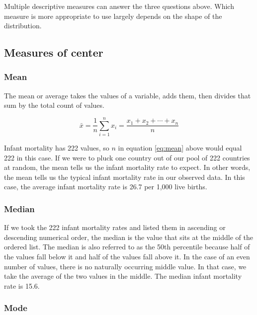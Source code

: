 \documentclass[
]{book}
\begin{document}
Multiple descriptive measures can answer the three questions above. Which measure is more appropriate to use largely depends on the shape of the distribution.

\hypertarget{measures-of-center}{%
\subsection{Measures of center}\label{measures-of-center}}

\hypertarget{mean}{%
\subsubsection*{Mean}\label{mean}}

The mean or average takes the values of a variable, adds them, then divides that sum by the total count of values.

\begin{equation}
{\displaystyle \bar{x}={\frac {1}{n}}\sum _{i=1}^{n}x_{i}={\frac {x_{1}+x_{2}+\cdots +x_{n}}{n}}}
\label{eq:mean}
\end{equation}

Infant mortality has 222 values, so \(n\) in equation \eqref{eq:mean} above would equal 222 in this case. If we were to pluck one country out of our pool of 222 countries at random, the mean tells us the infant mortality rate to expect. In other words, the mean tells us the typical infant mortality rate in our observed data. In this case, the average infant mortality rate is 26.7 per 1,000 live births.

\hypertarget{median}{%
\subsubsection*{Median}\label{median}}

If we took the 222 infant mortality rates and listed them in ascending or descending numerical order, the median is the value that sits at the middle of the ordered list. The median is also referred to as the 50th percentile because half of the values fall below it and half of the values fall above it. In the case of an even number of values, there is no naturally occurring middle value. In that case, we take the average of the two values in the middle. The median infant mortality rate is 15.6.

\hypertarget{mode}{%
\subsubsection*{Mode}\label{mode}}
\end{document}
